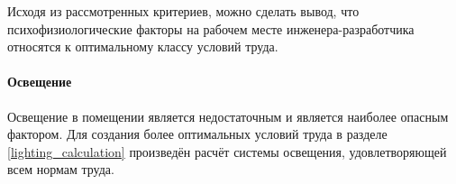 Исходя из рассмотренных критериев, можно сделать вывод, что психофизиологические
факторы на рабочем месте инженера-разработчика относятся к оптимальному классу
условий труда.

\paragraph{Освещение}

Освещение в помещении является недостаточным и является наиболее опасным фактором.
Для создания более оптимальных условий труда в разделе \ref{lighting_calculation} произведён расчёт
системы освещения, удовлетворяющей всем нормам труда.
